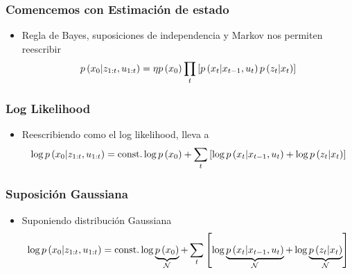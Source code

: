 \begin{frame}
    \frametitle{Comencemos con Estimación de estado}
    
    \begin{itemize}
        \item Regla de Bayes, suposiciones de independencia y Markov nos permiten reescribir
        \begin{equation*}
            p\left( x_{0} | z_{1:t}, u_{1:t} \right) = \eta p\left( x_{0} \right) \prod_{t} \left[ p\left( x_{t} | x_{t-1}, u_{t} \right) p\left( z_{t} | x_{t} \right) \right]
        \end{equation*}
    \end{itemize}
    
\end{frame}

\begin{frame}
    \frametitle{Log Likelihood}
    
    \begin{itemize}
        \item Reescribiendo como el log likelihood, lleva a
        \begin{equation*}
            \log p\left( x_{0} | z_{1:t}, u_{1:t} \right) = \text{const.}  \log p\left( x_{0} \right) + \sum_{t} \left[ \log p\left( x_{t} | x_{t-1}, u_{t} \right) + \log p\left( z_{t} | x_{t} \right) \right]
        \end{equation*}
    \end{itemize}
    
\end{frame}

\begin{frame}
    \frametitle{Suposición Gaussiana}
    
    \begin{itemize}
        \item Suponiendo distribución Gaussiana
        \begin{equation*}
            \log p\left( x_{0} | z_{1:t}, u_{1:t} \right) = \text{const.}  \log \underbrace{p\left( x_{0} \right)}_{\mathcal{N}} + \sum_{t} \left[ \log \underbrace{p\left( x_{t} | x_{t-1}, u_{t} \right)}_{\mathcal{N}} + \log \underbrace{p\left( z_{t} | x_{t} \right)}_{\mathcal{N}} \right]
        \end{equation*}
    \end{itemize}
    
\end{frame}

